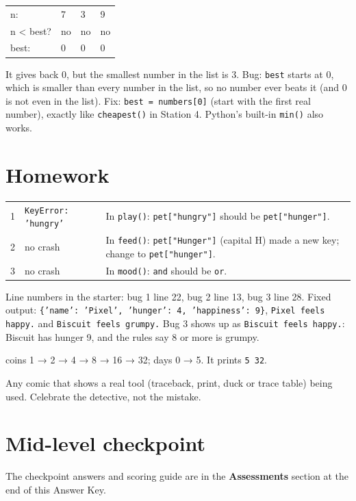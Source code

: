 \begin{answer}
\begin{tabular}{@{}llll@{}}
n: & 7 & 3 & 9 \\
n < best? & no & no & no \\
best: & 0 & 0 & 0 \\
\end{tabular}\par
It gives back 0, but the smallest number in the list is 3. Bug: \texttt{best} starts at 0, which is smaller than every number in the list,
so no number ever beats it (and 0 is not even in the list). Fix: \texttt{best = numbers[0]} (start with the first real number),
exactly like \texttt{cheapest()} in Station 4. Python's built-in \texttt{min()} also works.
\end{answer}

\section{Homework}
\begin{answer}
\begin{tabular}{@{}lp{2.6cm}p{9cm}@{}}
1 & \texttt{KeyError: 'hungry'} & In \texttt{play()}: \texttt{pet["hungry"]} should be \texttt{pet["hunger"]}. \\
2 & no crash & In \texttt{feed()}: \texttt{pet["Hunger"]} (capital H) made a new key; change to \texttt{pet["hunger"]}. \\
3 & no crash & In \texttt{mood()}: \texttt{and} should be \texttt{or}. \\
\end{tabular}\par
Line numbers in the starter: bug 1 line 22, bug 2 line 13, bug 3 line 28. Fixed output:
\texttt{\{'name': 'Pixel', 'hunger': 4, 'happiness': 9\}}, \texttt{Pixel feels happy.} and \texttt{Biscuit feels grumpy.}
Bug 3 shows up as \texttt{Biscuit feels happy.}: Biscuit has hunger 9, and the rules say 8 or more is grumpy.
\end{answer}

\begin{answer}
coins 1 → 2 → 4 → 8 → 16 → 32; days 0 → 5. It prints \texttt{5 32}.
\end{answer}

\begin{answer}
Any comic that shows a real tool (traceback, print, duck or trace table) being used. Celebrate the detective, not the mistake.
\end{answer}

\section{Mid-level checkpoint}
The checkpoint answers and scoring guide are in the \textbf{Assessments} section at the end of this Answer Key.
